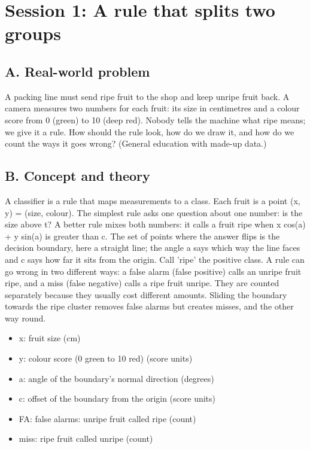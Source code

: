 \documentclass[11pt,a4paper]{article}
\begin{document}
\section{Session 1: A rule that splits two groups}

\subsection*{A. Real-world problem}
A packing line must send ripe fruit to the shop and keep unripe fruit back. A camera measures two numbers for each fruit: its size in centimetres and a colour score from 0 (green) to 10 (deep red). Nobody tells the machine what ripe means; we give it a rule. How should the rule look, how do we draw it, and how do we count the ways it goes wrong? (General education with made-up data.)

\subsection*{B. Concept and theory}
A classifier is a rule that maps measurements to a class. Each fruit is a point (x, y) = (size, colour). The simplest rule asks one question about one number: is the size above t? A better rule mixes both numbers: it calls a fruit ripe when x cos(a) + y sin(a) is greater than c. The set of points where the answer flips is the decision boundary, here a straight line; the angle a says which way the line faces and c says how far it sits from the origin. Call 'ripe' the positive class. A rule can go wrong in two different ways: a false alarm (false positive) calls an unripe fruit ripe, and a miss (false negative) calls a ripe fruit unripe. They are counted separately because they usually cost different amounts. Sliding the boundary towards the ripe cluster removes false alarms but creates misses, and the other way round.

\begin{itemize}[nosep]
\item x: fruit size (cm)
\item y: colour score (0 green to 10 red) (score units)
\item a: angle of the boundary's normal direction (degrees)
\item c: offset of the boundary from the origin (score units)
\item FA: false alarms: unripe fruit called ripe (count)
\item miss: ripe fruit called unripe (count)
\end{itemize}
\end{document}
